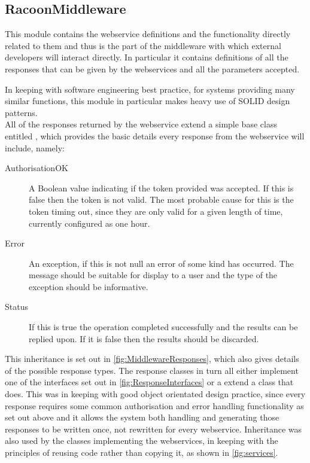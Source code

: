 \subsection{RacoonMiddleware}
\label{sec:middlewaremodule}
This module contains the webservice definitions and the functionality directly related to them and thus is the part of the middleware with which external developers will interact directly. In particular it contains definitions of all the responses that can be given by the webservices and all the parameters accepted.

In keeping with software engineering best practice, for systems providing many similar functions, this module in particular makes heavy use of SOLID design patterns. \\ All of the responses returned by the webservice extend a simple base class entitled , which provides the basic details every response from the webservice will include, namely:
\begin{description}
    \item[AuthorisationOK] A Boolean value indicating if the token provided was accepted. If this is false then the token is not valid. The most probable cause for this is the token timing out, since they are only valid for a given length of time, currently configured as one hour.
    \item[Error] An exception, if this is not null an error of some kind has occurred. The message should be suitable for display to a user and the type of the exception should be informative.
    \item[Status] If this is true the operation completed successfully and the results can be replied upon. If it is false then the results should be discarded. 
\end{description}

This inheritance is set out in \autoref{fig:MiddlewareResponses}, which also gives details of the possible response types. The response classes in turn all either implement one of the interfaces set out in \autoref{fig:ResponseInterfaces} or a extend a class that does. This was in keeping with good object orientated design practice, since every response requires some common authorisation and error handling functionality as set out above and it allows the system both handling and generating those responses to be written once, not rewritten for every webservice.  Inheritance was also used by the classes implementing the webservices, in keeping with the principles of reusing code rather than copying it, as shown in \autoref{fig:services}.

